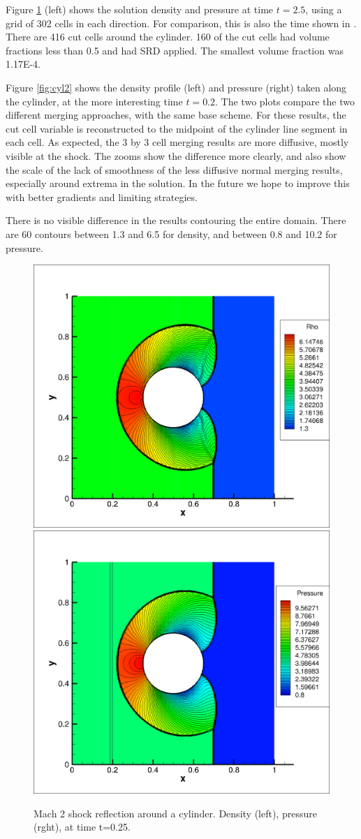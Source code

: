 Figure \ref{fig:cyl1} (left) shows the solution density and pressure  at time $t=2.5$,
using a grid of 302 cells in each direction. For comparison, this is also 
the time shown in
\cite{mjb-hel-rjl:hbox2}. There are 416 cut cells
around the cylinder. 160 of the cut cells had volume fractions less than
0.5 and had SRD applied.  The smallest volume fraction was 1.17E-4.   

Figure \ref{fig:cyl2}
shows the density profile (left) and pressure (right) 
taken along the cylinder, at the more
interesting time $t=0.2$. The two plots compare the two different merging
approaches, with the same base scheme. 
For these results, the cut cell variable is
reconstructed to the midpoint of the cylinder line segment in each  cell.  
As expected, the 3 by 3 cell merging results are more
diffusive, mostly visible at the shock. The zooms show the difference more
clearly, and also show the scale of the lack of smoothness of the less
diffusive normal merging results, especially around extrema in the
solution. In the future we hope to improve this
with better gradients and limiting strategies.

There is no visible 
difference in the results contouring the entire domain.
There are 60 contours between 1.3 and 6.5 for density, and between 0.8 and
10.2 for pressure.

\begin{figure}
\begin{center}
\hspace*{-.4in}
\includegraphics[width=0.48\linewidth,trim=10 10 200 10,clip]{figs/density_302_normal_muscl_cyl.png}
\vspace*{1.0in}
\includegraphics[width=0.48\linewidth,trim=10 10 200 10,clip]{figs/pressure_302_normal_muscl_cyl.png}
\caption{\sf Mach 2 shock reflection around a cylinder. Density (left),
pressure (rght), at time t=0.25.}
\label{fig:cyl1}
\end{center}
\end{figure}

